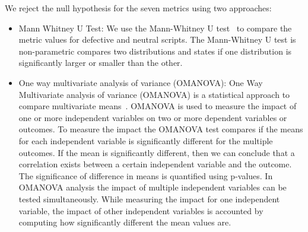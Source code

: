 \documentclass[smallextended]{svjour3}       %
\begin{document}
We reject the null hypothesis for the seven metrics using two approaches: 
\begin{itemize}
    \item{Mann Whitney U Test: We use the Mann-Whitney U test~\citep{mann:whitney:original} to compare the metric values for defective and neutral scripts. The Mann-Whitney U test is non-parametric compares two distributions and states if one distribution is significantly larger or smaller than the other. } 
    
    \item{ One way multivariate analysis of variance (OMANOVA): One Way Multivariate analysis of variance (OMANOVA) is a statistical approach to compare multivariate means~\citep{manova:book:huberty}. OMANOVA is used to measure the impact of one or more independent variables on two or more dependent variables or outcomes. To measure the impact the OMANOVA test compares if the means for each independent variable is significantly different for the multiple outcomes. If the mean is significantly different, then we can conclude that a correlation exists between a certain independent variable and the outcome. The significance of difference in means is quantified using p-values. In OMANOVA analysis the impact of multiple independent variables can be tested simultaneously. While measuring the impact for one independent variable, the impact of other independent variables is accounted by computing how significantly different the mean values are.       
    
}
\end{itemize}
\end{document}
